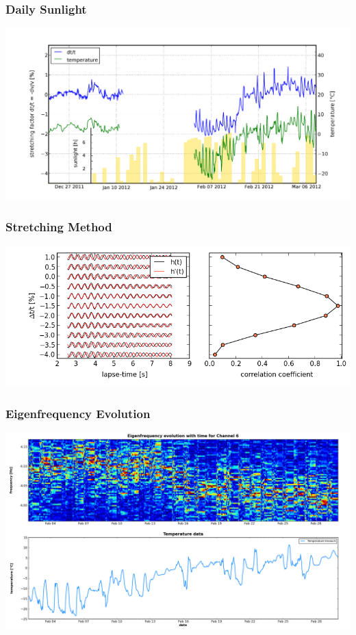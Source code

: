 \documentclass[compress=false,usepdftitle=false, subsection=false,xcolor=dvipsnames]{beamer}
\begin{document}
\begin{frame}[noframenumbering]
	\frametitle{Daily Sunlight}
	\begin{center}
		\includegraphics[width=\linewidth]{Figures/whole3.png}
    \end{center}
\end{frame}

\begin{frame}[noframenumbering]
	\frametitle{Stretching Method}
	\begin{center}
		\includegraphics[width=\linewidth]{Figures/stretchingMethod.png}
    \end{center}
\end{frame}

\begin{frame}[noframenumbering]
	\frametitle{Eigenfrequency Evolution}
	\begin{center}
		\includegraphics[width=\linewidth]{Figures/eigenfreq_evolution.png}
    \end{center}
\end{frame}
\end{document}
